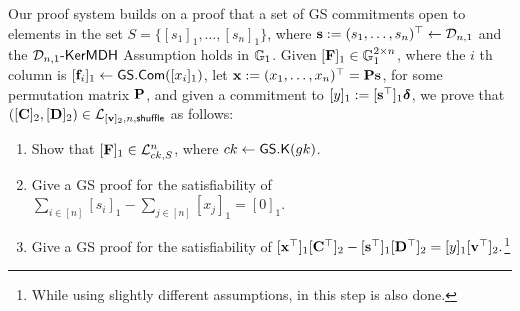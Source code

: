 Our proof system builds on a proof that a set of GS commitments open to elements in the set $S=\{[s_1]_1,\ldots,[s_n]_1\}$, where $\mathbf{s}:=(s_1,\ldots,s_n)^\top\gets\mathcal{D}_{n,1}$ and the $\mathcal{D}_{n,1}\mbox{-}\mathsf{KerMDH}$ Assumption holds in $\mathbb{G}_1$. Given $[\mathbf{{F}}]_1\in\mathbb{G}_1^{2\times n}$, where the $i$ th column is $[\mathbf{f}_i]_1\gets{\mathsf{GS}}.\mathsf{Com}([x_i]_1)$, let $\mathbf{x}:=({x}_1,\ldots,{x}_n)^\top=\mathbf{{P}}\mathbf{s}$, for some permutation matrix $\mathbf{{P}}$, and given a commitment to $[y]_1:=[\mathbf{s}^\top]_1{\boldsymbol \delta}$, we prove that $([\mathbf{{C}}]_2,[\mathbf{{D}}]_2)\in\mathcal{L}_{[\mathbf{v}]_2,n,\mathsf{shuffle}}$ as follows:
\begin{enumerate}[label=\alph*)]
\item Show that $[\mathbf{{F}}]_1\in\mathcal{L}_{ck,S}^n$, where $ck\gets{\mathsf{GS}}.\mathsf{K}({gk})$.\label{shuffle:a}
\item Give a GS proof for the satisfiability of $\sum_{i\in[n]}[s_i]_1-\sum_{j\in[n]}[{x}_j]_1=[0]_1$.\label{shuffle:b}
\item Give a GS proof for the satisfiability of
$
[\mathbf{x}^\top]_1[\mathbf{{C}}^\top]_2-[\mathbf{s}^\top]_1[\mathbf{{D}}^\top]_2=[y]_1[\mathbf{v}^\top]_2.\label{shuffle:c}
$\footnote{While using slightly different assumptions, in \cite{AC:GroLu07} this step is also done.}
\end{enumerate}


